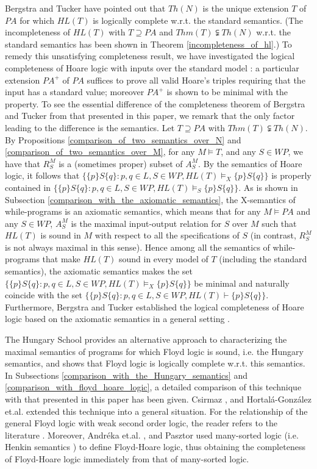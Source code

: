 \documentclass[a4paper,11pt]{article}
\begin{document}
Bergstra and Tucker \cite{bergstra_3} have pointed out that $Th(N)$ is the unique extension $T$ of $PA$ for which $HL(T)$ is logically complete w.r.t. the standard semantics. (The incompleteness of $HL(T)$ with $T \supseteq PA$ and $Thm(T)\subsetneqq Th(N)$ w.r.t. the standard semantics has been shown in Theorem \ref{incompleteness_of_hl}.) To remedy this unsatisfying completeness result, we have investigated the logical completeness of Hoare logic with inputs over the standard model \cite{xu16}: a particular extension $PA^+$ of $PA$ suffices to prove all valid Hoare's triples requiring that the input has a standard value; moreover $PA^+$ is shown to be minimal with the property. To see the essential difference of the completeness theorem of Bergstra and Tucker from that presented in this paper, we remark that the only factor leading to the difference is the semantics. Let $T \supseteq PA$ with $Thm(T)\subsetneqq Th(N)$. By Propositions \ref{comparison_of_two_semantics_over_N} and \ref{comparison_of_two_semantics_over_M}, for any $M\models T$, and any $S\in WP$, we have that $R_S^M$ is a (sometimes proper) subset of $A_S^M$. By the semantics of Hoare logic, it follows that $\{ \{p\}S\{q\} : p,q\in L, S\in WP, HL(T) \models_X \{p\}S\{q\} \}$ is properly contained in $\{ \{p\}S\{q\} : p,q\in L, S\in WP, HL(T) \models_S \{p\}S\{q\} \}$. As is shown in Subsection \ref{comparison_with_the_axiomatic_semantics}, the X-semantics of while-programs is an axiomatic semantics, which means that for any $M\models PA$ and any $S\in WP$, $A_S^M$ is the maximal input-output relation for $S$ over $M$ such that $HL(T)$ is sound in $M$ with respect to all the specifications of $S$ (in contrast, $R_S^M$ is not always maximal in this sense). Hence among all the semantics of while-programs that make $HL(T)$ sound in every model of $T$ (including the standard semantics), the axiomatic semantics makes the set $\{ \{p\}S\{q\} : p,q\in L, S\in WP, HL(T) \models_X \{p\}S\{q\} \}$ be minimal and naturally coincide with the set $\{ \{p\}S\{q\} : p,q\in L, S\in WP, HL(T) \vdash \{p\}S\{q\} \}$. Furthermore, Bergstra and Tucker established the logical completeness of Hoare logic based on the axiomatic semantics in a general setting \cite{bergstra_1}.

The Hungary School \cite{andreka_1,andreka_2,andreka_3} provides an alternative approach to characterizing the maximal semantics of programs for which Floyd logic is sound, i.e. the Hungary semantics, and shows that Floyd logic is logically complete w.r.t. this semantics. In Subsections \ref{comparison_with_the_Hungary_semantics} and \ref{comparison_with_floyd_hoare_logic}, a detailed comparison of this technique with that presented in this paper has been given. Csirmaz \cite{csirmaz_1}, and Hortal\'{a}-Gonz\'{a}lez et.al. \cite{hortala_1} extended this technique into a general situation. For the relationship of the general Floyd logic with weak second order logic, the reader refers to the literature \cite{makowsky_1}. Moreover, Andr\'{e}ka et.al. \cite{andreka_4}, and Pasztor \cite{pasztor_1} used many-sorted logic (i.e. Henkin semantics \cite{henkin_1}) to define Floyd-Hoare logic, thus obtaining the completeness of Floyd-Hoare logic immediately from that of many-sorted logic.
\end{document}

